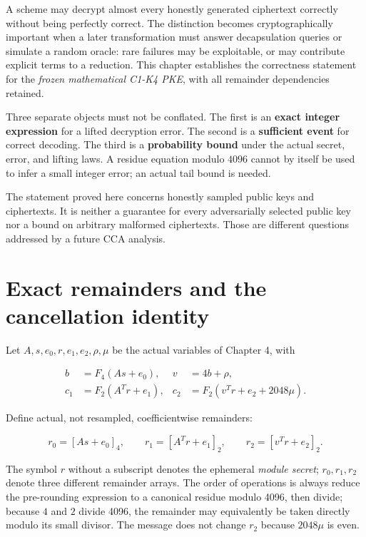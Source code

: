 \documentclass[
  11pt,
  a4paper,
  oneside]{report}
\begin{document}
A scheme may decrypt almost every honestly generated ciphertext
correctly without being perfectly correct. The distinction becomes
cryptographically important when a later transformation must answer
decapsulation queries or simulate a random oracle: rare failures may be
exploitable, or may contribute explicit terms to a reduction. This
chapter establishes the correctness statement for the \emph{frozen
mathematical C1-K4 PKE}, with all remainder dependencies retained.

Three separate objects must not be conflated. The first is an
\textbf{exact integer expression} for a lifted decryption error. The
second is a \textbf{sufficient event} for correct decoding. The third is
a \textbf{probability bound} under the actual secret, error, and lifting
laws. A residue equation modulo \(4096\) cannot by itself be used to
infer a small integer error; an actual tail bound is needed.

The statement proved here concerns honestly sampled public keys and
ciphertexts. It is neither a guarantee for every adversarially selected
public key nor a bound on arbitrary malformed ciphertexts. Those are
different questions addressed by a future CCA analysis.

\section{Exact remainders and the cancellation
identity}\label{exact-remainders-and-the-cancellation-identity}

Let \(A,s,e_0,r,e_1,e_2,\rho,\mu\) be the actual variables of Chapter 4,
with

\[
\begin{aligned}
b&=F_4(As+e_0),& v&=4b+\rho,\\
c_1&=F_2(A^Tr+e_1),&
c_2&=F_2(v^Tr+e_2+2048\mu).
\end{aligned}
\]

Define actual, not resampled, coefficientwise remainders:

\[
r_0=[As+e_0]_4,\qquad
r_1=[A^Tr+e_1]_2,\qquad
r_2=[v^Tr+e_2]_2.
\]

The symbol \(r\) without a subscript denotes the ephemeral \emph{module
secret}; \(r_0,r_1,r_2\) denote three different remainder arrays. The
order of operations is always reduce the pre-rounding expression to a
canonical residue modulo 4096, then divide; because \(4\) and \(2\)
divide 4096, the remainder may equivalently be taken directly modulo its
small divisor. The message does not change \(r_2\) because \(2048\mu\)
is even.
\end{document}
